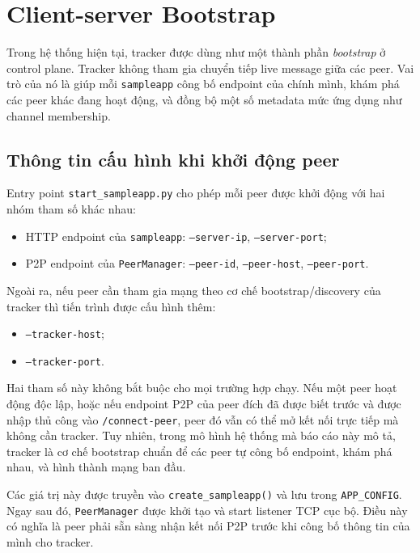 \section{Client-server Bootstrap}

Trong hệ thống hiện tại, tracker được dùng như một thành phần \textit{bootstrap} ở control plane. Tracker không tham gia chuyển tiếp live message giữa các peer. Vai trò của nó là giúp mỗi \texttt{sampleapp} công bố endpoint của chính mình, khám phá các peer khác đang hoạt động, và đồng bộ một số metadata mức ứng dụng như channel membership.

\subsection{Thông tin cấu hình khi khởi động peer}
Entry point \texttt{start\_sampleapp.py} cho phép mỗi peer được khởi động với hai nhóm tham số khác nhau:
\begin{itemize}[leftmargin=2em]
    \item HTTP endpoint của \texttt{sampleapp}: \texttt{--server-ip}, \texttt{--server-port};
    \item P2P endpoint của \texttt{PeerManager}: \texttt{--peer-id}, \texttt{--peer-host}, \texttt{--peer-port}.
\end{itemize}

Ngoài ra, nếu peer cần tham gia mạng theo cơ chế bootstrap/discovery của tracker thì tiến trình được cấu hình thêm:
\begin{itemize}[leftmargin=2em]
    \item \texttt{--tracker-host};
    \item \texttt{--tracker-port}.
\end{itemize}

Hai tham số này không bắt buộc cho mọi trường hợp chạy. Nếu một peer hoạt động độc lập, hoặc nếu endpoint P2P của peer đích đã được biết trước và được nhập thủ công vào \texttt{/connect-peer}, peer đó vẫn có thể mở kết nối trực tiếp mà không cần tracker. Tuy nhiên, trong mô hình hệ thống mà báo cáo này mô tả, tracker là cơ chế bootstrap chuẩn để các peer tự công bố endpoint, khám phá nhau, và hình thành mạng ban đầu.

Các giá trị này được truyền vào \texttt{create\_sampleapp()} và lưu trong \texttt{APP\_CONFIG}. Ngay sau đó, \texttt{PeerManager} được khởi tạo và start listener TCP cục bộ. Điều này có nghĩa là peer phải sẵn sàng nhận kết nối P2P trước khi công bố thông tin của mình cho tracker.

